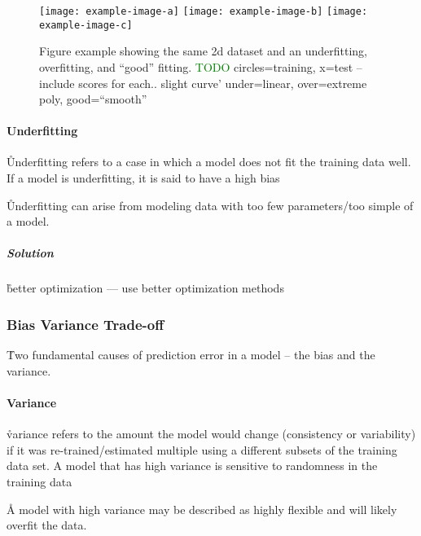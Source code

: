\begin{figure}[htp]
	\centering
	\texttt{[image: example-image-a]}\hfil
	\texttt{[image: example-image-b]}\hfil
	\texttt{[image: example-image-c]}\hfil
	\caption{Figure example showing the same 2d dataset and an underfitting, overfitting, and ``good'' fitting. \textcolor{green}{TODO} circles=training, x=test -- include scores for each.. slight curve' under=linear, over=extreme poly, good=``smooth''}
	\label{fig:basics_eval_fitting_examples}
\end{figure}

\paragraph{Underfitting}

\r{Underfitting refers to a case in which a model does not fit the training data well. If a model is underfitting, it is said to have a high bias}

\r{Underfitting can arise from modeling data with too few parameters/too simple of a model.}


\subparagraph{Solution}


\r{better optimization --- use better optimization methods \ALR}


\subsubsection{Bias Variance Trade-off}

\r{Two fundamental causes of prediction error in a model -- the bias and the variance.}

\paragraph{Variance}
\r{variance refers to the amount the model would change (consistency or variability) if it was re-trained/estimated multiple using a different subsets of the training data set. A model that has high variance is sensitive to randomness in the training data}

\r{A model with high variance may be described as highly flexible and will likely overfit the data.}


